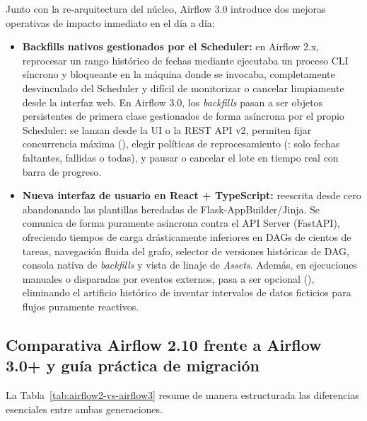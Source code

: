 Junto con la re-arquitectura del núcleo, Airflow 3.0 introduce dos mejoras operativas de impacto inmediato en el día a día:
\begin{itemize}
  \item \textbf{Backfills nativos gestionados por el Scheduler:} en Airflow 2.x, reprocesar un rango histórico de fechas mediante  ejecutaba un proceso CLI síncrono y bloqueante en la máquina donde se invocaba, completamente desvinculado del Scheduler y difícil de monitorizar o cancelar limpiamente desde la interfaz web. En Airflow 3.0, los \textit{backfills} pasan a ser objetos persistentes de primera clase gestionados de forma asíncrona por el propio Scheduler: se lanzan desde la UI o la REST API v2, permiten fijar concurrencia máxima (), elegir políticas de reprocesamiento (: solo fechas faltantes, fallidas o todas), y pausar o cancelar el lote en tiempo real con barra de progreso.
  \item \textbf{Nueva interfaz de usuario en React + TypeScript:} reescrita desde cero abandonando las plantillas heredadas de Flask-AppBuilder/Jinja. Se comunica de forma puramente asíncrona contra el API Server (FastAPI), ofreciendo tiempos de carga drásticamente inferiores en DAGs de cientos de tareas, navegación fluida del grafo, selector de versiones históricas de DAG, consola nativa de \textit{backfills} y vista de linaje de \textit{Assets}. Además, en ejecuciones manuales o disparadas por eventos externos,  pasa a ser opcional (), eliminando el artificio histórico de inventar intervalos de datos ficticios para flujos puramente reactivos.
\end{itemize}

\subsection{Comparativa Airflow 2.10 frente a Airflow 3.0+ y guía práctica de migración}\label{subsec:migracion-airflow3}

La Tabla~\ref{tab:airflow2-vs-airflow3} resume de manera estructurada las diferencias esenciales entre ambas generaciones.

